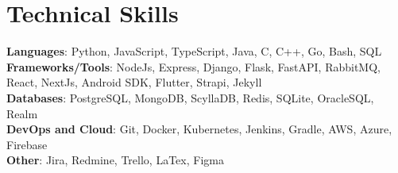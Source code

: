\section{Technical Skills}
\small
\textbf{Languages}{: \small Python, JavaScript, TypeScript, Java, C, C++, Go, Bash, SQL} \\
\vspace{2.5pt}\textbf{Frameworks/Tools}{: \small NodeJs, Express, Django, Flask, FastAPI, RabbitMQ, React, NextJs, Android SDK, Flutter, Strapi, Jekyll} \\
\vspace{2.5pt}\textbf{Databases}{: \small PostgreSQL, MongoDB, ScyllaDB, Redis, SQLite, OracleSQL, Realm} \\
\vspace{2.5pt}\textbf{DevOps and Cloud}{: \small Git, Docker, Kubernetes, Jenkins, Gradle, AWS, Azure, Firebase} \\
\vspace{2.5pt}\textbf{Other}{: \small Jira, Redmine, Trello, LaTex, Figma}